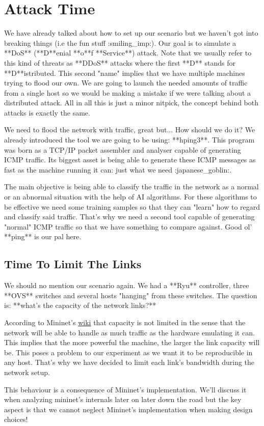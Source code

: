 \documentclass[12pt]{report}
\newcommand{\newpar} {
    \vskip 1cm
}
\begin{document}
	\section{Attack Time}
		We have already talked about how to set up our scenario but we haven't got into breaking things (i.e the fun stuff :smiling_imp:). Our goal is to simulate a **DoS** (**D**enial **o**f **Service**) attack. Note that we usually refer to this kind of threats as **DDoS** attacks where the first **D** stands for **D**istributed. This second "name" implies that we have multiple machines trying to flood our own. We are going to launch the needed amounts of traffic from a single host so we would be making a mistake if we were talking about a distributed attack. All in all this is just a minor nitpick, the concept behind both attacks is exactly the same.
		\newpar
		We need to flood the network with traffic, great but... How should we do it? We already introduced the tool we are going to be using: **hping3**. This program was born as a TCP/IP packet assembler and analyser capable of generating ICMP traffic. Its biggest asset is being able to generate these ICMP messages as fast as the machine running it can: just what we need :japanese_goblin:.
		\newpar
		The main objective is being able to classify the traffic in the network as a normal or an abnormal situation with the help of AI algorithms. For these algorithms to be effective we need some training samples so that they can "learn" how to regard and classify said traffic. That's why we need a second tool capable of generating "normal" ICMP traffic so that we have something to compare against. Good ol' **ping** is our pal here.

		\subsection{Time To Limit The Links}
			We should no mention our scenario again. We had a **Ryu** controller, three **OVS** switches and several hosts "hanging" from these switches. The question is: **what's the capacity of the network links?**
			\newpar
			According to Mininet's \href{https://github.com/mininet/mininet/wiki/Introduction-to-Mininet}{wiki} that capacity is not limited in the sense that the network will be able to handle as much traffic as the hardware emulating it can. This implies that the more powerful the machine, the larger the link capacity will be. This poses a problem to our experiment as we want it to be reproducible in any host. That's why we have decided to limit each link's bandwidth during the network setup.
			\newpar
			This behaviour is a consequence of Mininet's implementation. We'll discuss it when analyzing mininet's internals later on later down the road but the key aspect is that we cannot neglect Mininet's implementation when making design choices!
\end{document}

